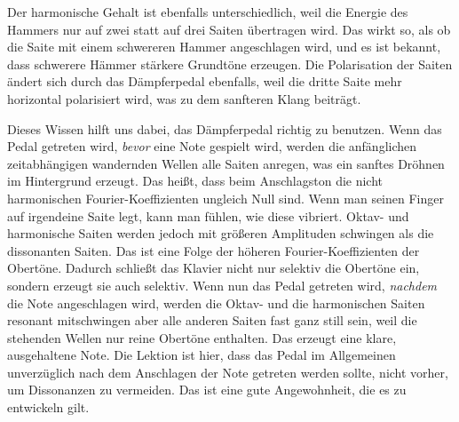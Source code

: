 Der harmonische Gehalt ist ebenfalls unterschiedlich, weil die Energie des Hammers nur auf zwei statt auf drei Saiten übertragen wird.
Das wirkt so, als ob die Saite mit einem schwereren Hammer angeschlagen wird, und es ist bekannt, dass schwerere Hämmer stärkere Grundtöne erzeugen.
Die Polarisation der Saiten ändert sich durch das Dämpferpedal ebenfalls, weil die dritte Saite mehr horizontal polarisiert wird, was zu dem sanfteren Klang beiträgt.

Dieses Wissen hilft uns dabei, das Dämpferpedal richtig zu benutzen.
Wenn das Pedal getreten wird, \textit{bevor} eine Note gespielt wird, werden die anfänglichen zeitabhängigen wandernden Wellen alle Saiten anregen, was ein sanftes Dröhnen im Hintergrund erzeugt.
Das heißt, dass beim Anschlagston die nicht harmonischen Fourier-Koeffizienten ungleich Null sind.
Wenn man seinen Finger auf irgendeine Saite legt, kann man fühlen, wie diese vibriert.
Oktav- und harmonische Saiten werden jedoch mit größeren Amplituden schwingen als die dissonanten Saiten.
Das ist eine Folge der höheren Fourier-Koeffizienten der Obertöne.
Dadurch schließt das Klavier nicht nur selektiv die Obertöne ein, sondern erzeugt sie auch selektiv.
Wenn nun das Pedal getreten wird, \textit{nachdem} die Note angeschlagen wird, werden die Oktav- und die harmonischen Saiten resonant mitschwingen aber alle anderen Saiten fast ganz still sein, weil die stehenden Wellen nur reine Obertöne enthalten.
Das erzeugt eine klare, ausgehaltene Note.
Die Lektion ist hier, dass das Pedal im Allgemeinen unverzüglich nach dem Anschlagen der Note getreten werden sollte, nicht vorher, um Dissonanzen zu vermeiden.
Das ist eine gute Angewohnheit, die es zu entwickeln gilt.

